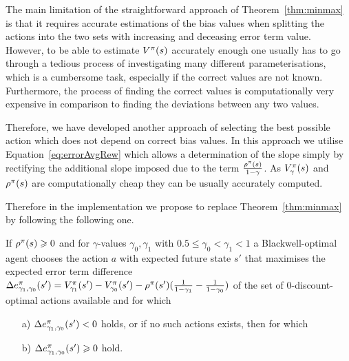 \documentclass[envcountsame]{llncs}
\begin{document}
The main limitation of the straightforward approach of Theorem~\ref{thm:minmax} is that it requires
accurate estimations of the bias values when splitting the actions into the two sets with increasing
and deceasing error term value. However, to be able to estimate \(V^{\pi}(s)\) accurately enough
one usually has to go through a tedious process of investigating many different parameterisations,
which is a cumbersome task, especially if the correct values are not known. Furthermore, the process
of finding the correct values is computationally very expensive in comparison to finding the
deviations between any two values.

Therefore, we have developed another approach of selecting the best possible action which does not
depend on correct bias values. In this approach we utilise Equation~\ref{eq:errorAvgRew} which
allows a determination of the slope simply by rectifying the additional slope imposed due to the
term \(\frac{\rho^{\pi}(s)}{1-\gamma}\). As \(V_{\gamma}^{\pi}(s)\) and \(\rho^{\pi}(s)\)
are computationally cheap they can be usually accurately computed.

Therefore in the implementation we propose to replace Theorem~\ref{thm:minmax} by following the
following one.

\begin{theorem}\label{thm:err}
  If \(\rho^{\pi}(s) \geqslant 0\) and for \(\gamma\)-values \(\gamma_{0}, \gamma_{1}\) with
  \(0.5 \leqslant \gamma_{0} < \gamma_{1} < 1\) a Blackwell-optimal agent chooses the action \(a\)
  with expected future state \(s'\) that maximises the expected error term difference
  \(\Delta e_{\gamma_{1},\gamma_{0}}^{\pi}(s') = V_{\gamma_{1}}^{\pi}(s') -
  V_{\gamma_{0}}^{\pi}(s') - \rho^{\pi}(s') (\frac{1}{1-\gamma_{1}} - \frac{1}{1-\gamma_{0}})\)
  of the set of \(0\)-discount-optimal actions available and for which
  \begin{itemize}
  \item[a)] \(\Delta e_{\gamma_{1},\gamma_{0}}^{\pi}(s') < 0\) holds, or if
    no such actions exists, then for which
  \item[b)]
    \(\Delta e_{\gamma_{1},\gamma_{0}}^{\pi}(s') \geqslant 0\) hold.
  \end{itemize}
\end{theorem}
\end{document}
